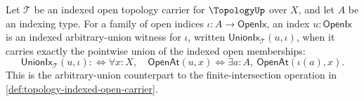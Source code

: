 \begin{definition}
\label{def:topology-indexed-arbitrary-union-witness}
Let $\mathcal{T}$ be an indexed open topology carrier for $\TopologyUp$ over $X$, and let $A$ be an indexing type. For a family of open indices $\iota:A\to\mathsf{OpenIx}$, an index $u:\mathsf{OpenIx}$ is an indexed arbitrary-union witness for $\iota$, written $\mathsf{UnionIx}_{\mathcal{T}}(u,\iota)$, when it carries exactly the pointwise union of the indexed open memberships:
$$
\mathsf{UnionIx}_{\mathcal{T}}(u,\iota)
:\Longleftrightarrow
\forall x:X,\quad
\mathsf{OpenAt}(u,x)
\Longleftrightarrow
\exists a:A,\ \mathsf{OpenAt}(\iota(a),x).
$$
This is the arbitrary-union counterpart to the finite-intersection operation in \autoref{def:topology-indexed-open-carrier}.
\end{definition}

